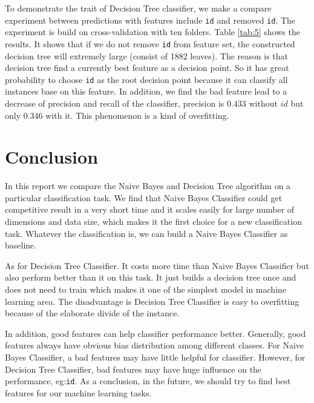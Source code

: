 \documentclass[11pt]{article}
\begin{document}
To demonstrate the trait of Decision Tree classifier, we make a compare experiment between predictions with features include \texttt{id} and removed \texttt{id}. The experiment is build on cross-validation with ten folders. Table \ref{tab:5} shows the results. It shows that if we do not remove \texttt{id} from feature set, the constructed decision tree will extremely large (consist of 1882 leaves). The reason is that decision tree find a currently best feature as a decision point. So it has great probability to choose \texttt{id} as the root decision point because it can classify all instances base on this feature. In addition, we find the bad feature lead to a decrease of precision and recall of the classifier, precision is 0.433 without $id$ but only 0.346 with it. This phenomenon is a kind of overfitting.

\section{Conclusion}

In this report we compare the Naive Bayes and Decision Tree algorithm on a particular classification task. We find that Naive Bayes Classifier could get competitive result in a very short time and it scales easily for large number of dimensions and data size, which makes it the first choice for a new classification task. Whatever the classification is, we can build a Naive Bayes Classifier as baseline.

As for Decision Tree Classifier. It costs more time than Naive Bayes Classifier but also perform better than it on this task. It just builds a decision tree once and does not need to train which makes it one of the simplest model in machine learning area. The disadvantage is Decision Tree Classifier is easy to overfitting because of the elaborate divide of the instance.

In addition, good features can help classifier performance better. Generally, good features always have obvious bias distribution among different classes. For Naive Bayes Classifier, a bad features may have little helpful for classifier. However, for Decision Tree Classifier, bad features may have huge influence on the performance, eg:\texttt{id}. As a conclusion, in the future, we should try to find best features for our machine learning tasks.



\end{document}
